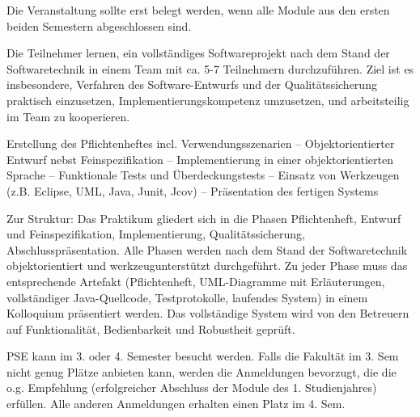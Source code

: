 \begin{module}
\begin{styleenv}
\begin{conditions}
\end{conditions}

\begin{recommendations}Die Veranstaltung sollte erst belegt werden, wenn alle Module aus den ersten beiden Semestern abgeschlossen sind.

\end{recommendations}
\end{styleenv}

\begin{learningoutcomes}
Die Teilnehmer lernen, ein vollständiges Softwareprojekt nach dem Stand der Softwaretechnik in einem Team mit ca. 5-7 Teilnehmern durchzuführen. Ziel ist es insbesondere, Verfahren des Software-Entwurfs und der Qualitätssicherung praktisch einzusetzen, Implementierungskompetenz umzusetzen, und arbeitsteilig im Team zu kooperieren.


\end{learningoutcomes}

\begin{content}
Erstellung des Pflichtenheftes incl. Verwendungsszenarien – Objektorientierter Entwurf nebst Feinspezifikation – Implementierung in einer objektorientierten Sprache – Funktionale Tests und Überdeckungstests – Einsatz von Werkzeugen (z.B. Eclipse, UML, Java, Junit, Jcov) – Präsentation des fertigen Systems


\end{content}

\begin{remarks}Zur Struktur: Das Praktikum gliedert sich in die Phasen Pflichtenheft, Entwurf und Feinspezifikation, Implementierung, Qualitätssicherung, Abschlusspräsentation. Alle Phasen werden nach dem Stand der Softwaretechnik objektorientiert und werkzeugunterstützt durchgeführt. Zu jeder Phase muss das entsprechende Artefakt (Pflichtenheft, UML-Diagramme mit Erläuterungen, vollständiger Java-Quellcode, Testprotokolle, laufendes System) in einem Kolloquium präsentiert werden. Das vollständige System wird von den Betreuern auf Funktionalität, Bedienbarkeit und Robustheit geprüft.

 

PSE kann im 3. oder 4. Semester besucht werden. Falls die Fakultät im 3. Sem nicht genug Plätze anbieten kann, werden die Anmeldungen bevorzugt, die die o.g. Empfehlung (erfolgreicher Abschluss der Module des 1. Studienjahres) erfüllen. Alle anderen Anmeldungen erhalten einen Platz im 4. Sem.

\end{remarks}

\end{module}

